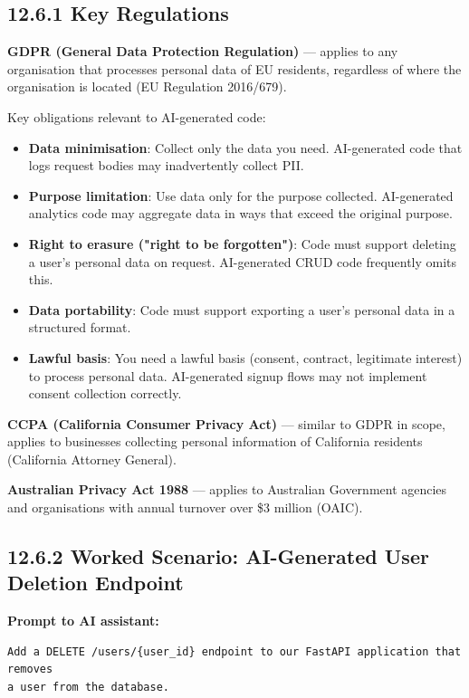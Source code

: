 \documentclass[11pt,a4paper]{book}
\begin{document}
\subsection{12.6.1 Key Regulations}

\textbf{GDPR (General Data Protection Regulation)} --- applies to any organisation that processes personal data of EU residents, regardless of where the organisation is located (EU Regulation 2016/679).

Key obligations relevant to AI-generated code:
\begin{itemize}
  \item \textbf{Data minimisation}: Collect only the data you need. AI-generated code that logs request bodies may inadvertently collect PII.
  \item \textbf{Purpose limitation}: Use data only for the purpose collected. AI-generated analytics code may aggregate data in ways that exceed the original purpose.
  \item \textbf{Right to erasure ("right to be forgotten")}: Code must support deleting a user's personal data on request. AI-generated CRUD code frequently omits this.
  \item \textbf{Data portability}: Code must support exporting a user's personal data in a structured format.
  \item \textbf{Lawful basis}: You need a lawful basis (consent, contract, legitimate interest) to process personal data. AI-generated signup flows may not implement consent collection correctly.
\end{itemize}

\textbf{CCPA (California Consumer Privacy Act)} --- similar to GDPR in scope, applies to businesses collecting personal information of California residents (California Attorney General).

\textbf{Australian Privacy Act 1988} --- applies to Australian Government agencies and organisations with annual turnover over \$3 million (OAIC).

\subsection{12.6.2 Worked Scenario: AI-Generated User Deletion Endpoint}

\textbf{Prompt to AI assistant:}
\begin{lstlisting}
Add a DELETE /users/{user_id} endpoint to our FastAPI application that removes 
a user from the database.
\end{lstlisting}
\end{document}
